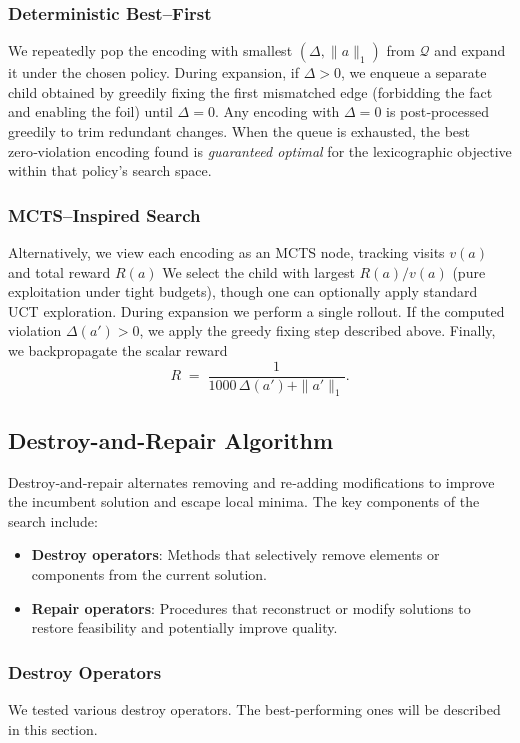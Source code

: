 \documentclass{article}
\begin{document}
\subsubsection{Deterministic Best–First}
We repeatedly pop the encoding with smallest \((\Delta,\|a\|_1)\) from \(\mathcal Q\) and expand it under the chosen policy.  During expansion, if \(\Delta>0\), we enqueue a separate child obtained by greedily fixing the first mismatched edge (forbidding the fact and enabling the foil) until \(\Delta=0\).  Any encoding with \(\Delta=0\) is post‑processed greedily to trim redundant changes.  When the queue is exhausted, the best zero‑violation encoding found is \emph{guaranteed optimal} for the lexicographic objective within that policy’s search space.

\subsubsection{MCTS–Inspired Search}
Alternatively, we view each encoding as an MCTS node, tracking visits $v(a)$ and total reward $R(a)$
We select the child with largest $R(a)/v(a)$ (pure exploitation under tight budgets), though one can optionally apply standard UCT exploration.  During expansion we perform a single rollout. If the computed violation $\Delta(a')>0$, we apply the greedy fixing step described above. Finally, we backpropagate the scalar reward
\[
  R \;=\;\frac{1}{1000\,\Delta(a') + \|a'\|_1}.
\]



\subsection{Destroy-and-Repair Algorithm}
Destroy‐and‐repair alternates removing and re‐adding modifications to improve the incumbent solution and escape local minima. The key components of the search include:

\begin{itemize}
   \item \textbf{Destroy operators}: Methods that selectively remove elements or components from the current solution.
   \item \textbf{Repair operators}: Procedures that reconstruct or modify solutions to restore feasibility and potentially improve quality.
 \end{itemize}

\subsubsection{Destroy Operators}
We tested various destroy operators. The best-performing ones will be described in this section.
\end{document}
